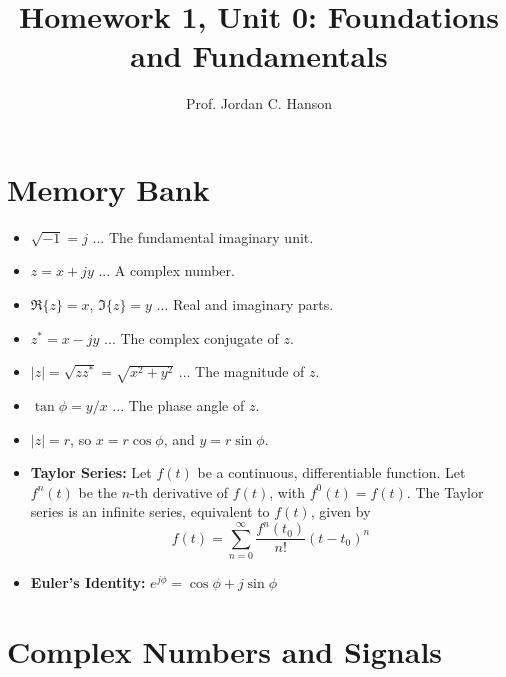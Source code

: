 \documentclass{article}
\begin{document}
\twocolumn

\title{Homework 1, Unit 0: Foundations and Fundamentals}
\author{Prof. Jordan C. Hanson}

\maketitle

\section{Memory Bank}

\begin{itemize}
\item $\sqrt{-1} = j$ ... The fundamental imaginary unit.
\item $z = x + jy$ ... A complex number.
\item $\Re \lbrace z \rbrace = x$, $\Im \lbrace z \rbrace = y$ ... Real and imaginary parts.
\item $z^{*} = x - j y$ ... The complex conjugate of $z$.
\item $|z| = \sqrt{z z^{*}} = \sqrt{x^2 + y^2}$ ... The magnitude of $z$.
\item $\tan\phi = y/x$ ... The phase angle of $z$.
\item $|z| = r$, so $x = r\cos\phi$, and $y = r\sin\phi$.
\item \textbf{Taylor Series:} Let $f(t)$ be a continuous, differentiable function.  Let $f^n(t)$ be the $n$-th derivative of $f(t)$, with $f^0(t) = f(t)$. The Taylor series is an infinite series, equivalent to $f(t)$, given by
\begin{equation}
f(t) = \sum_{n=0}^{\infty} \frac{f^n(t_0)}{n!} (t-t_0)^n
\end{equation}
\item \textbf{Euler's Identity:} $e^{j\phi} = \cos\phi + j\sin\phi$
\end{itemize}
\normalsize

\section{Complex Numbers and Signals}
\end{document}

